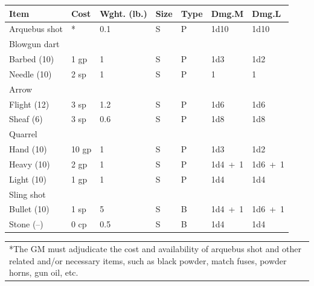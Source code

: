 \noindent
\begin{minipage}{\columnwidth}

\label{ammunition}
\noindent
\begin{tabular}{|p{}|p{}|p{}|p{}|p{}|p{}|p{}|}
\hline
Item			& Cost	& Wght. (lb.)	& Size	& Type	& Dmg.M	& Dmg.L \\
\hline\hline
\rowcolor[gray]{.9}Arquebus shot	& *		& 0.1	& S	& P	& 1d10	& 1d10 \\
Blowgun dart	& 		& 		& 	& 	& 		&  \\
\hspace{1em}Barbed (10)	& 1 gp	& 1		& S	& P	& 1d3	& 1d2 \\
\rowcolor[gray]{.9}\hspace{1em}Needle (10)	& 2 sp	& 1		& S	& P	& 1		& 1 \\
Arrow			& 		& 		& 	& 	& 		&  \\
\hspace{1em}Flight (12)	& 3 sp	& 1.2	& S	& P	& 1d6	& 1d6 \\
\rowcolor[gray]{.9}\hspace{1em}Sheaf (6)		& 3 sp	& 0.6	& S	& P	& 1d8	& 1d8 \\
Quarrel			& 		& 		& 	& 	& 		&  \\
\hspace{1em}Hand (10)		& 10 gp	& 1		& S	& P	& 1d3	& 1d2 \\
\rowcolor[gray]{.9}\hspace{1em}Heavy (10)	& 2 gp	& 1		& S	& P	& 1d4~+~1	& 1d6~+~1 \\
\hspace{1em}Light (10)	& 1 gp	& 1		& S	& P	& 1d4	& 1d4 \\
\rowcolor[gray]{.9}Sling shot		& 		& 		& 	& 	& 		&  \\
\rowcolor[gray]{.9}\hspace{1em}Bullet (10)	& 1 sp	& 5		& S	& B	& 1d4~+~1	& 1d6~+~1 \\
\hspace{1em}Stone (--)	& 0 cp	& 0.5	& S	& B	& 1d4	& 1d4 \\
\hline
\end{tabular}
\noindent\begin{tabular}{p{}}
*The GM must adjudicate the cost and availability of arquebus shot and other related and/or necessary items, such as black powder, match fuses, powder horns, gun oil, etc. \\
\end{tabular}\vspace{.5em}

\end{minipage}

